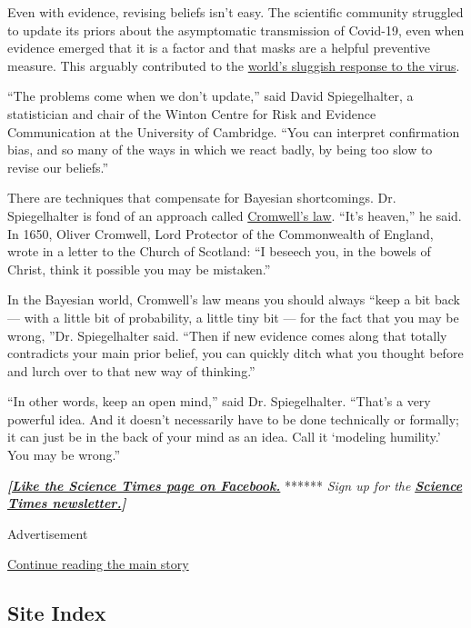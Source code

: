 Even with evidence, revising beliefs isn't easy. The scientific
community struggled to update its priors about the asymptomatic
transmission of Covid-19, even when evidence emerged that it is a factor
and that masks are a helpful preventive measure. This arguably
contributed to the
\href{https://www.nytimes3xbfgragh.onion/2020/06/27/world/europe/coronavirus-spread-asymptomatic.html?action=click\&module=RelatedLinks\&pgtype=Article}{world's
sluggish response to the virus}.

``The problems come when we don't update,'' said David Spiegelhalter, a
statistician and chair of the Winton Centre for Risk and Evidence
Communication at the University of Cambridge. ``You can interpret
confirmation bias, and so many of the ways in which we react badly, by
being too slow to revise our beliefs.''

There are techniques that compensate for Bayesian shortcomings. Dr.
Spiegelhalter is fond of an approach called
\href{https://understandinguncertainty.org/node/97}{Cromwell's law}.
``It's heaven,'' he said. In 1650, Oliver Cromwell, Lord Protector of
the Commonwealth of England, wrote in a letter to the Church of
Scotland: ``I beseech you, in the bowels of Christ, think it possible
you may be mistaken.''

In the Bayesian world, Cromwell's law means you should always ``keep a
bit back --- with a little bit of probability, a little tiny bit --- for
the fact that you may be wrong, ''Dr. Spiegelhalter said. ``Then if new
evidence comes along that totally contradicts your main prior belief,
you can quickly ditch what you thought before and lurch over to that new
way of thinking.''

``In other words, keep an open mind,'' said Dr. Spiegelhalter. ``That's
a very powerful idea. And it doesn't necessarily have to be done
technically or formally; it can just be in the back of your mind as an
idea. Call it `modeling humility.' You may be wrong.''

\textbf{\emph{{[}}\href{http://on.fb.me/1paTQ1h}{\emph{Like the Science
Times page on Facebook.}}} ****** \emph{\textbar{} Sign up for the}
\textbf{\href{http://nyti.ms/1MbHaRU}{\emph{Science Times
newsletter.}}\emph{{]}}}

Advertisement

\protect\hyperlink{after-bottom}{Continue reading the main story}

\hypertarget{site-index}{%
\subsection{Site Index}\label{site-index}}

